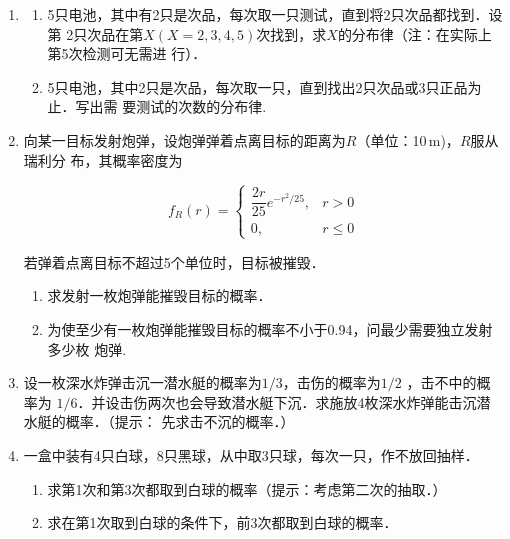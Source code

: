 \documentclass[10pt,a4paper]{article}
\begin{document}
\begin{enumerate}
    \item \begin{enumerate}
        \item 5只电池，其中有2只是次品，每次取一只测试，直到将2只次品都找到．设第
        2只次品在第$X(X=2,3,4,5)$次找到，求$X$的分布律（注：在实际上第5次检测可无需进
        行）．
        \item 5只电池，其中2只是次品，每次取一只，直到找出2只次品或3只正品为止．写出需
        要测试的次数的分布律.
    \end{enumerate}



    \item 向某一目标发射炮弹，设炮弹弹着点离目标的距离为$R$（单位：10$\, $m)，$R$服从瑞利分
    布，其概率密度为
    \vspace{-0.5cm}
    \begin{spacing}{2.0}
    $$f_R(r)=\left\{\begin{array}{ll}
        \dfrac{2r}{25}e^{-r^2/25},& r>0\\
        0, & r\leq 0
    \end{array}\right.$$
    \end{spacing}
    \vspace{-0.5cm}
    若弹着点离目标不超过5个单位时，目标被摧毁．
    \begin{enumerate}
        \item 求发射一枚炮弹能摧毁目标的概率．
        \item 为使至少有一枚炮弹能摧毁目标的概率不小于0.94，问最少需要独立发射多少枚
        炮弹.
    \end{enumerate}
    



    \item 设一枚深水炸弹击沉一潜水艇的概率为$1/3$，击伤的概率为$1/2$ ，击不中的概率为
    $1/6$．并设击伤两次也会导致潜水艇下沉．求施放4枚深水炸弹能击沉潜水艇的概率．（提示：
    先求击不沉的概率．）



    \item 一盒中装有4只白球，8只黑球，从中取3只球，每次一只，作不放回抽样．
    \begin{enumerate}
        \item 求第1次和第3次都取到白球的概率（提示：考虑第二次的抽取．）
        \item 求在第1次取到白球的条件下，前3次都取到白球的概率．
    \end{enumerate}




\end{enumerate}
\end{document}
